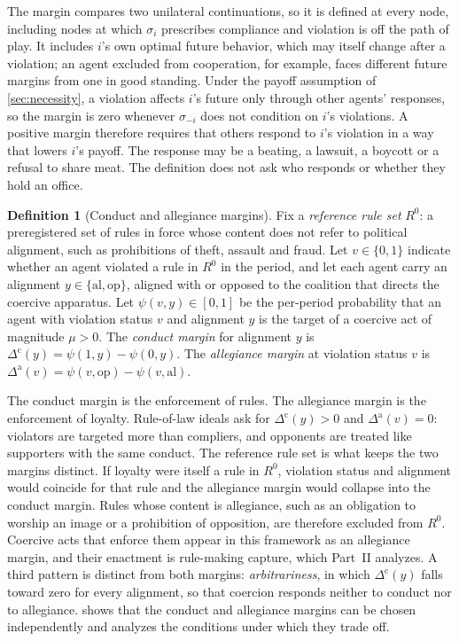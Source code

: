 \documentclass[11pt,letterpaper]{article}
\theoremstyle{definition}
\newtheorem{definition}[theorem]{Definition}
\theoremstyle{remark}
\begin{document}
The margin compares two unilateral continuations, so it is defined at every node, including nodes at which $\sigma_i$ prescribes compliance and violation is off the path of play. It includes $i$'s own optimal future behavior, which may itself change after a violation; an agent excluded from cooperation, for example, faces different future margins from one in good standing. Under the payoff assumption of \cref{sec:necessity}, a violation affects $i$'s future only through other agents' responses, so the margin is zero whenever $\sigma_{-i}$ does not condition on $i$'s violations. A positive margin therefore requires that others respond to $i$'s violation in a way that lowers $i$'s payoff. The response may be a beating, a lawsuit, a boycott or a refusal to share meat. The definition does not ask who responds or whether they hold an office.

\begin{definition}[Conduct and allegiance margins]
\label{def:coercive-power:margins}
Fix a \emph{reference rule set} $R^0$: a preregistered set of rules in force whose content does not refer to political alignment, such as prohibitions of theft, assault and fraud. Let $v \in \{0,1\}$ indicate whether an agent violated a rule in $R^0$ in the period, and let each agent carry an alignment $y \in \{\mathrm{al}, \mathrm{op}\}$, aligned with or opposed to the coalition that directs the coercive apparatus. Let $\psi(v,y) \in [0,1]$ be the per-period probability that an agent with violation status $v$ and alignment $y$ is the target of a coercive act of magnitude $\mu > 0$. The \emph{conduct margin} for alignment $y$ is $\Delta^{\mathrm{c}}(y) = \psi(1,y) - \psi(0,y)$. The \emph{allegiance margin} at violation status $v$ is $\Delta^{\mathrm{a}}(v) = \psi(v,\mathrm{op}) - \psi(v,\mathrm{al})$.
\end{definition}

The conduct margin is the enforcement of rules. The allegiance margin is the enforcement of loyalty. Rule-of-law ideals ask for $\Delta^{\mathrm{c}}(y) > 0$ and $\Delta^{\mathrm{a}}(v) = 0$: violators are targeted more than compliers, and opponents are treated like supporters with the same conduct. The reference rule set is what keeps the two margins distinct. If loyalty were itself a rule in $R^0$, violation status and alignment would coincide for that rule and the allegiance margin would collapse into the conduct margin. Rules whose content is allegiance, such as an obligation to worship an image or a prohibition of opposition, are therefore excluded from $R^0$. Coercive acts that enforce them appear in this framework as an allegiance margin, and their enactment is rule-making capture, which Part~II analyzes. A third pattern is distinct from both margins: \emph{arbitrariness}, in which $\Delta^{\mathrm{c}}(y)$ falls toward zero for every alignment, so that coercion responds neither to conduct nor to allegiance.  shows that the conduct and allegiance margins can be chosen independently and analyzes the conditions under which they trade off.
\end{document}

